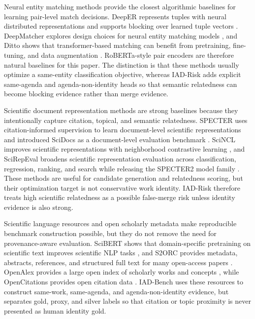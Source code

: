 \documentclass[preprint,12pt]{elsarticle}
\begin{document}
Neural entity matching methods provide the closest algorithmic baselines for learning pair-level match decisions. DeepER represents tuples with neural distributed representations and supports blocking over learned tuple vectors \citep{ebraheem2018deeper}. DeepMatcher explores design choices for neural entity matching models \citep{mudgal2018deep}, and Ditto shows that transformer-based matching can benefit from pretraining, fine-tuning, and data augmentation \citep{li2020ditto}. RoBERTa-style pair encoders \citep{liu2019roberta} are therefore natural baselines for this paper. The distinction is that these methods usually optimize a same-entity classification objective, whereas IAD-Risk adds explicit same-agenda and agenda-non-identity heads so that semantic relatedness can become blocking evidence rather than merge evidence.

Scientific document representation methods are strong baselines because they intentionally capture citation, topical, and semantic relatedness. SPECTER uses citation-informed supervision to learn document-level scientific representations and introduced SciDocs as a document-level evaluation benchmark \citep{cohan2020specter}. SciNCL improves scientific representations with neighborhood contrastive learning \citep{ostendorff2022scincl}, and SciRepEval broadens scientific representation evaluation across classification, regression, ranking, and search while releasing the SPECTER2 model family \citep{singh2022scirepeval}. These methods are useful for candidate generation and relatedness scoring, but their optimization target is not conservative work identity. IAD-Risk therefore treats high scientific relatedness as a possible false-merge risk unless identity evidence is also strong.

Scientific language resources and open scholarly metadata make reproducible benchmark construction possible, but they do not remove the need for provenance-aware evaluation. SciBERT shows that domain-specific pretraining on scientific text improves scientific NLP tasks \citep{beltagy2019scibert}, and S2ORC provides metadata, abstracts, references, and structured full text for many open-access papers \citep{lo2019s2orc}. OpenAlex provides a large open index of scholarly works and concepts \citep{priem2022openalex}, while OpenCitations provides open citation data \citep{heibi2019opencitations}. IAD-Bench uses these resources to construct same-work, same-agenda, and agenda-non-identity evidence, but separates gold, proxy, and silver labels so that citation or topic proximity is never presented as human identity gold.
\end{document}
